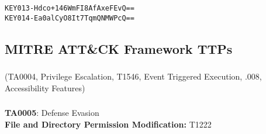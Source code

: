 \documentclass[notitlepage]{article}
\begin{document}
    \begin{verbatim}
KEY013-Hdco+146WmFI8AfAxeFEvQ==
KEY014-Ea0alCyO8It7TqmQNMWPcQ==
    \end{verbatim}

    \subsection{MITRE ATT{\&}CK Framework TTPs}	
	\subsubsection*{}
	\ttp(TA0004, Privilege Escalation, T1546, Event Triggered Execution, .008, Accessibility Features)
    
    \subsubsection*{}
    \indent\textbf{TA0005}: Defense Evasion \\
    \indent\indent\textbf{File and Directory Permission Modification:} T1222 \\
\end{document}
